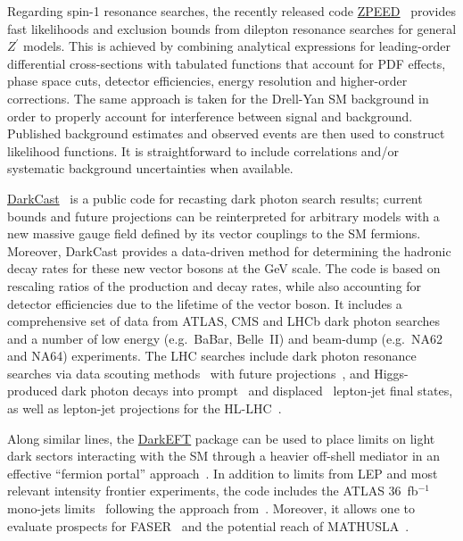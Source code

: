 \documentclass[a4paper,aps,prd,longbibliography,notitlepage,showpacs,amsmath,amssymb,superscriptaddress,nofootinbib,floatfix,11pt,preprintnumbers]{revtex4-1-mod}
\newcommand{\darkcast}{\textsf{DarkCast}\xspace}
\newcommand{\zpeed}{\textsf{ZPEED}\xspace}
\newcommand{\eg}{e.g.\xspace}
\begin{document}
Regarding spin-1 resonance searches, the recently released code \href{https://github.com/kahlhoefer/ZPEED}{\zpeed}~\cite{Kahlhoefer:2019vhz} provides fast likelihoods and exclusion bounds from dilepton resonance searches for general $Z^\prime$ models. This is achieved by combining analytical expressions for leading-order differential cross-sections with tabulated functions that account for PDF  effects, phase space cuts, detector efficiencies, energy resolution and higher-order corrections. The same approach is taken for the Drell-Yan SM background in order to properly account for interference between signal and background. Published background estimates and observed events are then used to construct likelihood functions. It is straightforward to include correlations and/or systematic background uncertainties when available.

\href{https://gitlab.com/philten/darkcast}{\darkcast}~\cite{Ilten:2018crw} is a public code for recasting dark photon search results; current bounds and future projections can be reinterpreted for arbitrary models with a new massive gauge field defined by its vector couplings to the SM fermions.  Moreover, \darkcast provides a data-driven method for determining the hadronic decay rates for these new vector bosons at the GeV scale.
The code is based on rescaling ratios of the production and decay rates, while also accounting for detector efficiencies due to the lifetime of the vector boson.
It includes a comprehensive set of data from ATLAS, CMS and LHCb dark photon searches and a number of
low energy (\eg\ BaBar, \mbox{Belle II})
and beam-dump (\eg\ NA62 and NA64) experiments.
%
The LHC searches include dark photon resonance searches via data scouting methods~\cite{Aaij:2017rft,Aaij:2019bvg,CMS:2019kiy} with future projections~\cite{Ilten:2015hya,Ilten:2016tkc}, and Higgs-produced dark photon decays into prompt~\cite{Aad:2015sms,CMS:2016tgd,CMS:2018rdr} and displaced~\cite{Aad:2014yea} lepton-jet final states, as well as lepton-jet projections for the HL-LHC~\cite{CMS:2018lqx,Aad:2019pub}.

Along similar lines, the   \href{https://github.com/Luc-Darme/DarkEFT}{DarkEFT} package can be used to place limits on light dark sectors interacting with the SM through a heavier off-shell mediator in an effective ``fermion portal'' approach~\cite{Darme:2020ral}. In addition to limits from LEP and most relevant intensity frontier experiments, the code includes the ATLAS $36$~fb$^{-1}$ mono-jets limits~\cite{Aaboud:2017phn} following the approach from~\cite{Racco:2015dxa}.  Moreover, it  allows one to evaluate prospects for FASER~\cite{Feng:2017uoz} and the potential reach of MATHUSLA~\cite{Lubatti:2019vkf}.
\end{document}
